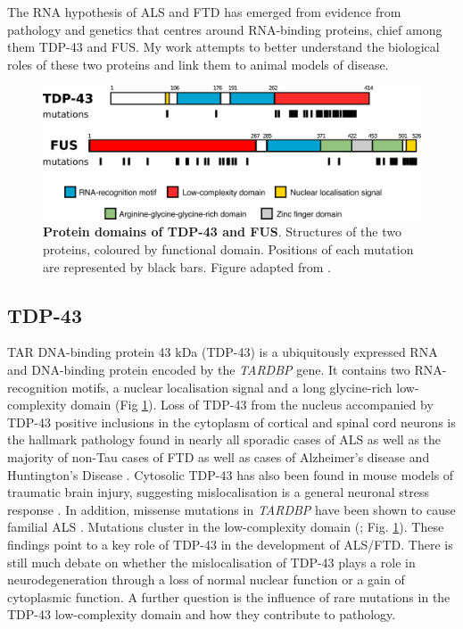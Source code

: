 The RNA hypothesis of ALS and FTD has emerged from evidence from pathology and genetics that centres around RNA-binding proteins, chief among them TDP-43 and FUS.
My work attempts to better understand the biological roles of these two proteins and link them to animal models of disease.

\begin{figure}[h!]
	\centering
	\includegraphics[width=\textwidth]{Figures/01_introduction/tdp_fus_structures.png}
	\caption[Protein domains of TDP-43 and FUS]{
		\textbf{Protein domains of TDP-43 and FUS}. Structures of the two proteins, coloured by functional domain. Positions of each mutation are represented by black bars. Figure adapted from \citep{Kapeli2017}. 
	}
	\label{fig:intro_domains}
\end{figure}


\subsection{TDP-43}

TAR DNA-binding protein 43 kDa (TDP-43) is a ubiquitously expressed RNA and DNA-binding protein encoded by the \emph{TARDBP} gene. 
It contains two RNA-recognition motifs, a nuclear localisation signal and a long glycine-rich low-complexity domain (Fig \ref{fig:intro_domains}).
Loss of TDP-43 from the nucleus accompanied by TDP-43 positive inclusions in the cytoplasm of cortical and spinal cord neurons is the hallmark pathology found in nearly all sporadic cases of ALS as well as the majority of non-Tau cases of FTD \citep{Neumann2006,Arai2006} as well as cases of Alzheimer's disease \citep{LaClair2016} and Huntington's Disease \citep{Doi2008}. 
Cytosolic TDP-43 has also been found in mouse models of traumatic brain injury, suggesting mislocalisation is a general neuronal stress response \citep{Moisse2009}. 
In addition, missense mutations in \emph{TARDBP} have been shown to cause familial ALS \citep{Sreedharan2008-xv}.  Mutations cluster in the low-complexity domain (\citealt{Kapeli2017}; Fig. \ref{fig:intro_domains}).
These findings point to a key role of TDP-43 in the development of ALS/FTD. 
There is still much debate on whether the mislocalisation of TDP-43 plays a role in neurodegeneration through a loss of normal nuclear function or a gain of cytoplasmic function.  
A further question is the influence of rare mutations in the TDP-43 low-complexity domain and how they contribute to pathology.

